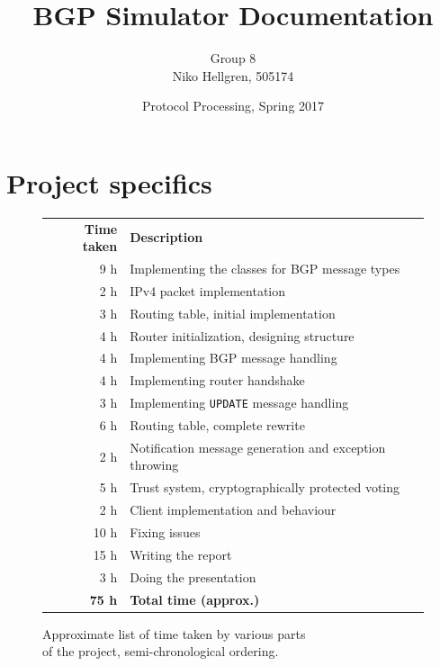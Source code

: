 \documentclass[11pt,a4paper,titlepage]{report}
\author{Group 8\\Niko Hellgren, 505174}
\title{BGP Simulator Documentation}
\date{Protocol Processing, Spring 2017}
\begin{document}
\maketitle
\tableofcontents
\pagebreak

\section{Project specifics}\label{sec:project}
\begin{figure}
\begin{center}
\begin{tabular}{r l}
\textbf{Time taken} & \textbf{Description}\\
9 h & Implementing the classes for BGP message types \\
2 h & IPv4 packet implementation \\
3 h & Routing table, initial implementation \\
4 h & Router initialization, designing structure \\
4 h & Implementing BGP message handling \\
4 h & Implementing router handshake \\
3 h & Implementing \texttt{UPDATE} message handling \\
6 h & Routing table, complete rewrite \\
2 h & Notification message generation and exception throwing \\
5 h & Trust system, cryptographically protected voting \\
2 h & Client implementation and behaviour \\
10 h & Fixing issues
\vspace{3mm} \\
15 h & Writing the report \\
3 h & Doing the presentation \\
\hline
\textbf{75 h} & \textbf{Total time (approx.)}
\end{tabular}
\end{center}
\caption{Approximate list of time taken by various parts\\of the project, semi-chronological ordering.}
\label{fig:timetaken}
\end{figure}
\end{document}
